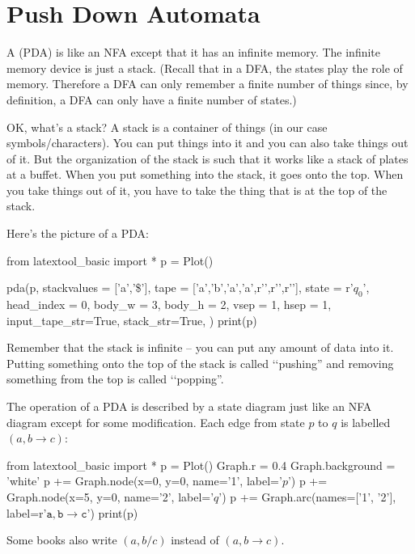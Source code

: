 \section{Push Down Automata}

A  (PDA) is like an NFA except that it has
an infinite memory. The infinite memory device is just a stack.
(Recall that in a DFA, the states play the role of memory.
Therefore a DFA can only remember a finite number of things since, by definition, a DFA
can only have a finite number of states.)

OK, what's a stack?
A stack is a container of things (in our case symbols/characters).
You can put things into it and you can also take things out of it.
But the organization of the stack is such that it works like a stack
of plates at a buffet.
When you put something into the stack, it goes onto the top.
When you take things out of it, you have to take the thing that is
at the top of the stack.

Here's the picture of a PDA:

\begin{python}
from latextool_basic import *
p = Plot()

pda(p,
    stackvalues = ['a','\$'],
    tape = ['a','b','a','a',r'\SPACE',r'\SPACE',r'\SPACE'],
    state = r'$q_0$',
    head_index = 0,
    body_w = 3,
    body_h = 2,
    vsep = 1,
    hsep = 1,
    input_tape_str=True,
    stack_str=True,
    )
print(p)
\end{python}

Remember that the stack is infinite -- you can put any amount of data into it.
Putting something onto the top of the stack is called \lq\lq pushing''
and removing something from the top is called \lq\lq popping''.

The operation of a PDA is described by a state diagram just like
an NFA diagram except for some modification.
Each edge from state $p$ to $q$ is labelled
$(a, b \rightarrow c)$:

\begin{python}
from latextool_basic import *
p = Plot()
Graph.r = 0.4
Graph.background = 'white'
p += Graph.node(x=0, y=0, name='1', label='$p$')
p += Graph.node(x=5, y=0, name='2', label='$q$')
p += Graph.arc(names=['1', '2'], label=r'$\texttt{a}, \texttt{b} \rightarrow \texttt{c} $')
print(p)
\end{python}


Some books also write
$(a,b/c)$
instead of
$(a, b \rightarrow c)$.

